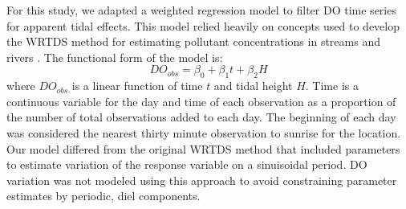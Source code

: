 \documentclass[letterpaper,12pt,oneside]{article}\usepackage[]{graphicx}\usepackage[]{color}
\begin{document}
For this study, we adapted a weighted regression model to filter \ac{DO} time series for apparent tidal effects.  This model relied heavily on concepts used to develop the \ac{WRTDS} method for estimating pollutant concentrations in streams and rivers \citep{Hirsch10}.  The functional form of the model is:
\begin{equation}\label{funform}
DO_{obs}= \beta_0 + \beta_1 t + \beta_2 H
\end{equation}
where $DO_{obs}$ is a linear function of time $t$ and tidal height $H$.  Time is a continuous variable for the day and time of each observation as a proportion of the number of total observations added to each day.  The beginning of each day was considered the nearest thirty minute observation to sunrise for the location.  Our model differed from the original \ac{WRTDS} method that included parameters to estimate variation of the response variable on a sinuisoidal period.  \ac{DO} variation was not modeled using this approach to avoid constraining parameter estimates by periodic, diel components.
\end{document}
